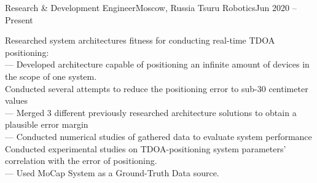 \resumeSubheading
  {Research \& Development Engineer}{Moscow, Russia}
  {Tsuru Robotics}{Jun 2020 -- Present}
  \begin{itemize}[leftmargin=0in, label={}]
    \small{\item{
      {Researched system architectures fitness for conducting real-time TDOA positioning:}\\
      {— Developed architecture capable of positioning an infinite amount of devices in the scope of one system.}\\
      {Conducted several attempts to reduce the positioning error to sub-30 centimeter values}\\
      {— Merged 3 different previously researched architecture solutions to obtain a plausible error margin}\\
      {— Conducted numerical studies of gathered data to evaluate system performance}\\
      {Conducted experimental studies on TDOA-positioning system parameters' correlation with the error of positioning.}\\
      {— Used MoCap System as a Ground-Truth Data source.}\\
    }}
   \end{itemize}
